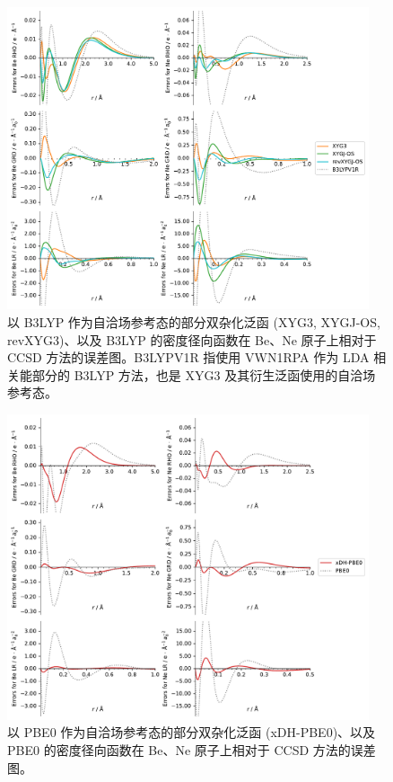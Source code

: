 \begin{figure}[hp]
    \centering
    \includegraphics[width=0.95\textwidth]{assets/supp-fig-s3.pdf}
    \caption[B3LYP 参考态泛函密度径向函数在 Be、Ne 原子的误差]{以 B3LYP 作为自洽场参考态的部分双杂化泛函 (XYG3, XYGJ-OS, revXYG3)、以及 B3LYP 的密度径向函数在 Be、Ne 原子上相对于 CCSD 方法的误差图。B3LYPV1R 指使用 VWN1RPA 作为 LDA 相关能部分的 B3LYP 方法，也是 XYG3 及其衍生泛函使用的自洽场参考态。}
    \label{fig.4.supp-fig-s3}
\end{figure}

\begin{figure}[hp]
    \centering
    \includegraphics[width=0.95\textwidth]{assets/supp-fig-s4.pdf}
    \caption[PBE0 参考态泛函密度径向函数在 Be、Ne 原子的误差]{以 PBE0 作为自洽场参考态的部分双杂化泛函 (xDH-PBE0)、以及 PBE0 的密度径向函数在 Be、Ne 原子上相对于 CCSD 方法的误差图。}
    \label{fig.4.supp-fig-s4}
\end{figure}

